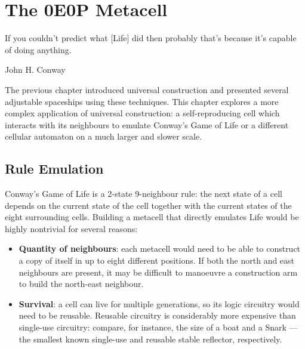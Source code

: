 
\renewcommand{\chapterfolder}{0e0p/}
\chapter{The 0E0P Metacell}\label{chp:0e0p}


\vspace*{-0.4in}
\epigraph{If you couldn't predict what [Life] did then probably that's because it's capable of doing anything.}{John H. Conway}
\vspace*{0.4in}


\noindent The previous chapter introduced universal construction and presented
several adjustable spaceships using these techniques. This chapter explores a
more complex application of universal construction: a self-reproducing cell
which interacts with its neighbours to emulate Conway's Game of Life or a
different cellular automaton on a much larger and slower scale.


\section{Rule Emulation}

Conway's Game of Life is a 2-state 9-neighbour rule: the next state of a cell
depends on the current state of the cell together with the current states of
the eight surrounding cells. Building a metacell that directly emulates Life
would be highly nontrivial for several reasons:

\begin{itemize}
\item \textbf{Quantity of neighbours}: each metacell would need to be able to
construct a copy of itself in up to eight different positions. If both the
north and east neighbours are present, it may be difficult to manoeuvre a
construction arm to build the north-east neighbour.
\item \textbf{Survival}: a cell can live for multiple generations, so its
logic circuitry would need to be reusable. Reusable circuitry is considerably
more expensive than single-use circuitry: compare, for instance, the size of
a boat and a Snark --- the smallest known single-use and reusable stable
reflector, respectively.
\end{itemize}

